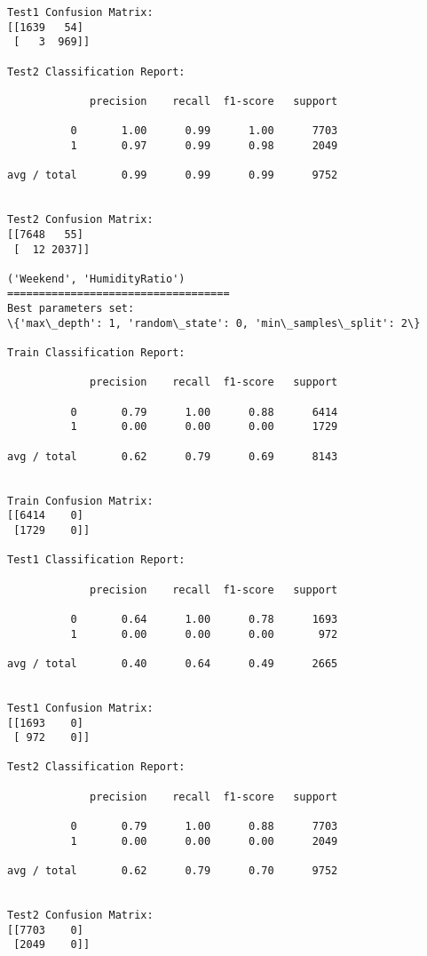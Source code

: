 \documentclass[11pt]{article}
\begin{document}
\begin{Verbatim}[commandchars=\\\{\}]
Test1 Confusion Matrix:
[[1639   54]
 [   3  969]]

Test2 Classification Report:

             precision    recall  f1-score   support

          0       1.00      0.99      1.00      7703
          1       0.97      0.99      0.98      2049

avg / total       0.99      0.99      0.99      9752


Test2 Confusion Matrix:
[[7648   55]
 [  12 2037]]

('Weekend', 'HumidityRatio')
===================================
Best parameters set:
\{'max\_depth': 1, 'random\_state': 0, 'min\_samples\_split': 2\}

Train Classification Report:

             precision    recall  f1-score   support

          0       0.79      1.00      0.88      6414
          1       0.00      0.00      0.00      1729

avg / total       0.62      0.79      0.69      8143


Train Confusion Matrix:
[[6414    0]
 [1729    0]]

Test1 Classification Report:

             precision    recall  f1-score   support

          0       0.64      1.00      0.78      1693
          1       0.00      0.00      0.00       972

avg / total       0.40      0.64      0.49      2665


Test1 Confusion Matrix:
[[1693    0]
 [ 972    0]]

Test2 Classification Report:

             precision    recall  f1-score   support

          0       0.79      1.00      0.88      7703
          1       0.00      0.00      0.00      2049

avg / total       0.62      0.79      0.70      9752


Test2 Confusion Matrix:
[[7703    0]
 [2049    0]]


    \end{Verbatim}
\end{document}
